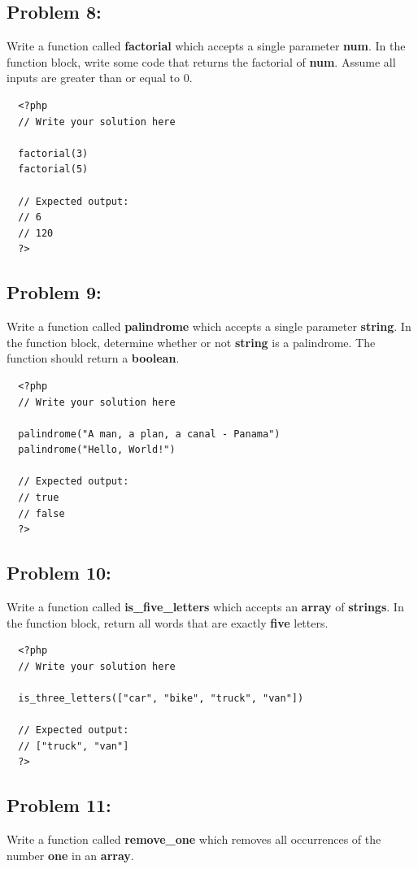 \documentclass{article}
\begin{document}
\subsection*{Problem 8:}
Write a function called \textbf{factorial} which accepts a single parameter \textbf{num}. In the function block, write some code that returns the factorial of \textbf{num}. Assume all inputs are greater than or equal to 0. 

\begin{verbatim}
  <?php  
  // Write your solution here

  factorial(3)
  factorial(5)

  // Expected output:
  // 6
  // 120
  ?>
\end{verbatim}

\subsection*{Problem 9:}
Write a function called \textbf{palindrome} which accepts a single parameter \textbf{string}. In the function block, determine whether or not \textbf{string} is a palindrome. The function should return a \textbf{boolean}.

\begin{verbatim}
  <?php  
  // Write your solution here

  palindrome("A man, a plan, a canal - Panama")
  palindrome("Hello, World!")

  // Expected output:
  // true
  // false
  ?>
\end{verbatim}
 
\subsection*{Problem 10:}
Write a function called \textbf{is\_five\_letters} which accepts an \textbf{array} of \textbf{strings}. In the function block, return all words that are exactly \textbf{five} letters.

\begin{verbatim}
  <?php  
  // Write your solution here

  is_three_letters(["car", "bike", "truck", "van"])

  // Expected output:
  // ["truck", "van"] 
  ?>
\end{verbatim}

\subsection*{Problem 11:}
Write a function called \textbf{remove\_one} which removes all occurrences of the number \textbf{one} in an \textbf{array}. 
\end{document}
